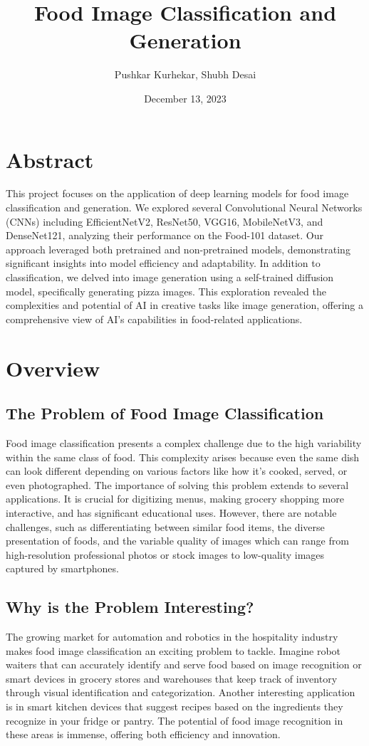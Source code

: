 \documentclass{article}
\title{Food Image Classification and Generation}
\author{Pushkar Kurhekar, Shubh Desai}
\date{December 13, 2023}
\begin{document}
\maketitle

\section{Abstract}
This project focuses on the application of deep learning models for food image classification and generation. We explored several Convolutional Neural Networks (CNNs) including EfficientNetV2, ResNet50, VGG16, MobileNetV3, and DenseNet121, analyzing their performance on the Food-101 dataset. Our approach leveraged both pretrained and non-pretrained models, demonstrating significant insights into model efficiency and adaptability. In addition to classification, we delved into image generation using a self-trained diffusion model, specifically generating pizza images. This exploration revealed the complexities and potential of AI in creative tasks like image generation, offering a comprehensive view of AI's capabilities in food-related applications.

\section{Overview}

\subsection{The Problem of Food Image Classification}
Food image classification presents a complex challenge due to the high variability within the same class of food. This complexity arises because even the same dish can look different depending on various factors like how it's cooked, served, or even photographed. The importance of solving this problem extends to several applications. It is crucial for digitizing menus, making grocery shopping more interactive, and has significant educational uses. However, there are notable challenges, such as differentiating between similar food items, the diverse presentation of foods, and the variable quality of images which can range from high-resolution professional photos or stock images to low-quality images captured by smartphones.

\subsection{Why is the Problem Interesting?}
The growing market for automation and robotics in the hospitality industry makes food image classification an exciting problem to tackle. Imagine robot waiters that can accurately identify and serve food based on image recognition or smart devices in grocery stores and warehouses that keep track of inventory through visual identification and categorization. Another interesting application is in smart kitchen devices that suggest recipes based on the ingredients they recognize in your fridge or pantry. The potential of food image recognition in these areas is immense, offering both efficiency and innovation.
\end{document}
